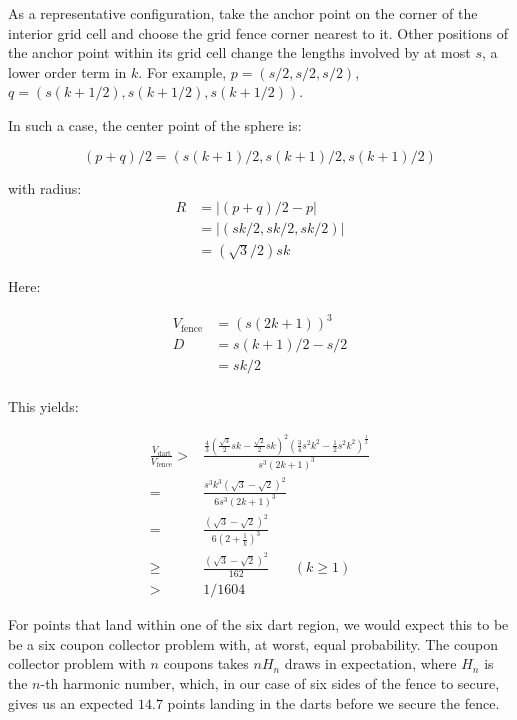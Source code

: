 \documentclass[a4paper,fleqn]{cas-dc}
\begin{document}
As a representative configuration, take the anchor point on the corner of the interior grid cell and choose the grid fence corner
nearest to it.
Other positions of the anchor point within its grid cell change the lengths involved by at most $s$, a lower order term in $k$.
For example, $p = (s/2,s/2,s/2)$, $q = ( s(k+1/2), s(k + 1/2), s(k+1/2) )$.

In such a case, the center point of the sphere is:

$$
(p + q)/2 = ( s(k+1)/2, s(k+1)/2, s(k+1)/2 )
$$

with radius:
$$
\begin{array}{ll}
  R & = |(p+q)/2 - p| \\
   & = |(sk/2,sk/2,sk/2)| \\
   & = (\sqrt{3}/2) sk
\end{array}
$$

Here:

$$
\begin{array}{ll}
  V _ {\text{fence}} & = (s(2k+1))^3 \\
  D & = s(k+1)/2 - s/2 \\
  & = sk / 2 \\
\end{array}
$$

This yields:

$$
\begin{array}{ll}
  \frac{ V_{\text{dart}} }{ V _ {\text{fence}}} > &  \frac{ \frac{4}{3} ( \frac{\sqrt{3}}{2} sk - \frac{\sqrt{2}}{2} sk)^2 ( \frac{3}{4}s^2 k^2 - \frac{1}{2} s^2 k^2 )^{\frac{1}{2}}  }{  s^3 (2k+1)^3  } \\[10pt]
  = & \frac{ s^3 k^3 ( \sqrt{3} - \sqrt{2} )^2 }{ 6 s^3 (2k+1)^3 } \\[10pt]
  = & \frac{ ( \sqrt{3} - \sqrt{2} )^2 }{ 6 (2+\frac{1}{k})^3 } \\[10pt]
  \ge & \frac{ ( \sqrt{3} - \sqrt{2} )^2 }{ 162 } \ \ \ \ \ \ \ \ (k \ge 1) \\[10pt]
  > & 1 / 1604
\end{array}
$$

For points that land within one of the six dart region, we would expect this to be be a six coupon collector
problem with, at worst, equal probability.
The coupon collector problem with $n$ coupons takes $n H _ n$ draws in expectation, where $H _ n$ is the $n$-th harmonic number, which,
in our case of six sides of the fence to secure,
gives us an expected $14.7$ points landing in the darts before we secure the fence.
\end{document}
